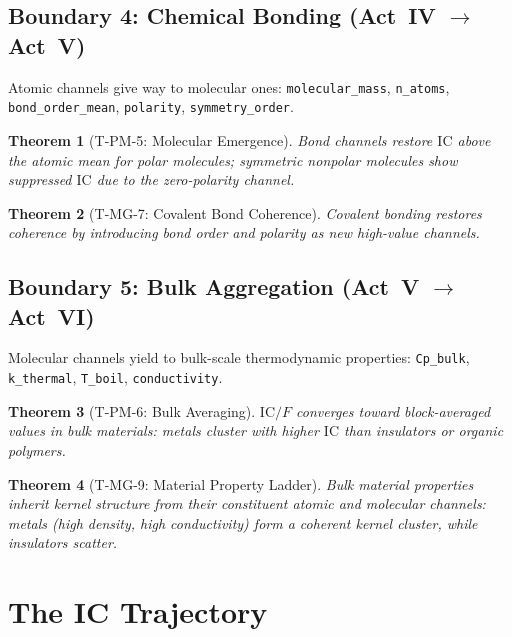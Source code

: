 \documentclass[
  aps,
  prd,
  twocolumn,
  superscriptaddress,
  nofootinbib,
  floatfix
]{revtex4-2}
\newtheorem{theorem}{Theorem}
\newcommand{\IC}{\mathrm{IC}}
\begin{document}
\subsection{Boundary 4: Chemical Bonding (Act~IV $\to$ Act~V)}
\label{sec:chemical}

Atomic channels give way to molecular ones:
\texttt{molecular\_mass}, \texttt{n\_atoms},
\texttt{bond\_order\_mean}, \texttt{polarity},
\texttt{symmetry\_order}.

\begin{theorem}[T-PM-5: Molecular Emergence]
\label{thm:molecular}
Bond channels restore $\IC$ above the atomic mean for
polar molecules; symmetric nonpolar molecules show
suppressed $\IC$ due to the zero-polarity channel.
\end{theorem}

\begin{theorem}[T-MG-7: Covalent Bond Coherence]
\label{thm:covalent}
Covalent bonding restores coherence by introducing bond
order and polarity as new high-value channels.
\end{theorem}

\subsection{Boundary 5: Bulk Aggregation (Act~V $\to$ Act~VI)}
\label{sec:bulk}

Molecular channels yield to bulk-scale thermodynamic
properties: \texttt{Cp\_bulk}, \texttt{k\_thermal},
\texttt{T\_boil}, \texttt{conductivity}.

\begin{theorem}[T-PM-6: Bulk Averaging]
\label{thm:bulk}
$\IC/F$ converges toward block-averaged values in bulk
materials: metals cluster with higher $\IC$ than insulators
or organic polymers.
\end{theorem}

\begin{theorem}[T-MG-9: Material Property Ladder]
\label{thm:ladder}
Bulk material properties inherit kernel structure from
their constituent atomic and molecular channels: metals
(high density, high conductivity) form a coherent kernel
cluster, while insulators scatter.
\end{theorem}

\section{The IC Trajectory}\label{sec:trajectory}
\end{document}
